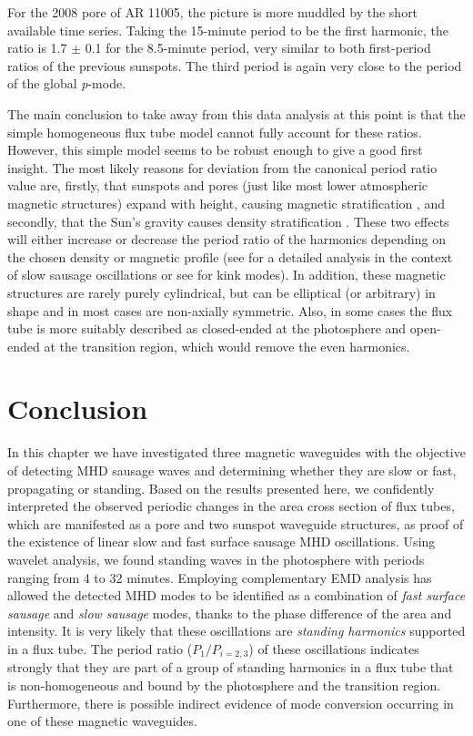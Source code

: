 	For the 2008 pore of AR 11005, the picture is more muddled by the short available time series.
	Taking the 15-minute period to be the first harmonic, the ratio is 1.7 $\pm$ 0.1 for the 8.5-minute period, very similar to both first-period ratios of the previous sunspots.
	The third period is again very close to the period of the global \textit{p}-mode.
	
	The main conclusion to take away from this data analysis at this point is that the simple homogeneous flux tube model cannot fully account for these ratios.
	However, this simple model seems to be robust enough to give a good first insight.
	The most likely reasons for deviation from the canonical period ratio value are, firstly, that sunspots and pores (just like most lower atmospheric magnetic structures) expand with height, causing magnetic stratification \citep{2008A&A...486.1015V,luna-cardozo}, and secondly, that the Sun's gravity causes density stratification \citep{Andries2009}.
	These two effects will either increase or decrease the period ratio of the harmonics depending on the chosen density or magnetic profile (see \citet{luna-cardozo} for a detailed analysis in the context of slow sausage oscillations or see \citet{2013SoPh..tmp..195E} for kink modes).
	In addition, these magnetic structures are rarely purely cylindrical, but can be elliptical (or arbitrary) in shape \citep[see][]{Ruderman2009,2009A&A...502..315M} and in most cases are non-axially symmetric.
	Also, in some cases the flux tube is more suitably described as closed-ended at the photosphere and open-ended at the transition region, which would remove the even harmonics.
	 
\section{Conclusion}

	In this chapter we have investigated three magnetic waveguides with the objective of detecting MHD sausage waves and determining whether they are slow or fast, propagating or standing.
	Based on the results presented here, we confidently interpreted the observed periodic changes in the area cross section of flux tubes, which are manifested as a pore and two sunspot waveguide structures, as proof of the existence of linear slow and fast surface sausage MHD oscillations.
	Using wavelet analysis, we found standing waves in the photosphere with periods ranging from 4 to 32 minutes.
	Employing complementary EMD analysis has allowed the detected MHD modes to be identified as a combination of \textit{fast surface sausage} and \textit{slow sausage} modes, thanks to the phase difference of the area and intensity.
	It is very likely that these oscillations are \textit{standing harmonics} supported in a flux tube.
	The period ratio ($P_{1}/P_{i=2,3}$) of these oscillations indicates strongly that they are part of a group of standing harmonics in a flux tube that is non-homogeneous and bound by the photosphere and the transition region.
	Furthermore, there is possible indirect evidence of mode conversion occurring in one of these magnetic waveguides.